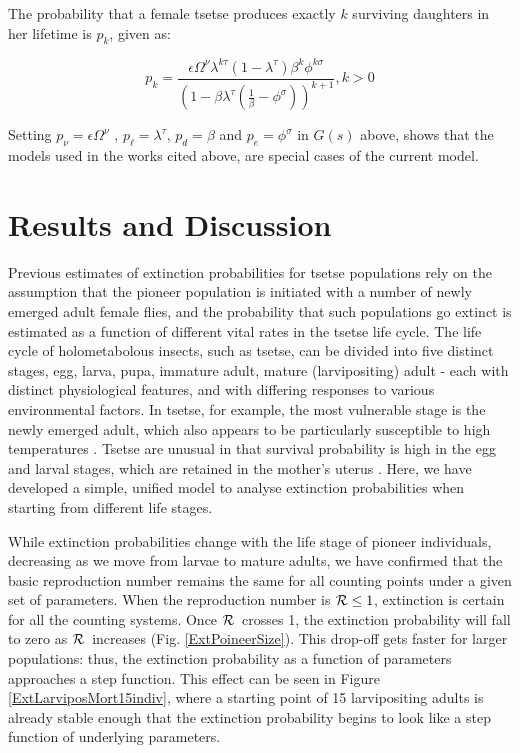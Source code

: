 \documentclass[smallextended]{svjour3}
\newcommand{\Rx}{\ensuremath{\cal R}}
\begin{document}
	The probability that a female tsetse produces exactly $k$ surviving daughters in her lifetime is $p_{k}$, given as:
	
	\begin{equation}
	\label{Johnframework}
	p_{k}= \frac{\epsilon \Omega^{\nu}\lambda^{k\tau}(1-\lambda^{\tau})\beta^{k}\phi^{k\sigma}}{(1-\beta \lambda^\tau(\frac{1}{\beta} -\phi^{\sigma}))^{k+1}},   k>0   
	\end{equation}
	
	Setting  $ p_{\nu}= \epsilon \Omega^{\nu}$ , $p_{\ell} =\lambda^{\tau} $, $p_{d}=\beta$  and $p_{e} = \phi^{\sigma} $ in  $G(s)$ above,   shows that the models used in the works cited above, are special cases of the current model. 
	
	\section{Results and Discussion}
	\label{section8}
	
	Previous estimates of extinction probabilities for tsetse populations rely on the assumption that the pioneer population is initiated with a number of newly emerged adult female flies, and the probability that such populations go extinct is estimated as a function of different vital rates in the tsetse life cycle. The life cycle of holometabolous insects, such as tsetse, can be divided into five distinct stages, egg, larva, pupa, immature adult, mature (larvipositing) adult - each with distinct physiological features, and with differing responses to various environmental factors. In tsetse, for example, the most vulnerable stage is the newly emerged adult, which also appears to be particularly susceptible to high temperatures \cite{Ackley2017a}. Tsetse are unusual in that survival probability is high in the egg and larval stages, which are retained in the mother's uterus \cite{Hargrove1999a}. Here, we have developed a simple, unified model to analyse extinction probabilities when starting from different life stages. 
	
	
	While extinction probabilities change with the life stage of pioneer individuals, decreasing as we move from larvae to mature adults,  we have confirmed that the basic reproduction number remains the same for all counting points under a given set of parameters. When the reproduction number is ${\cal R} \leq 1$, extinction is certain for all the counting systems. Once \Rx\ crosses 1, the extinction probability will fall to zero as \Rx\ increases (Fig. \ref{ExtPoineerSize}). This drop-off gets faster for larger populations: thus, the extinction probability as a function of parameters approaches a step function. This effect can be seen in Figure \ref{ExtLarviposMort15indiv}, where a starting point of 15 larvipositing adults is already stable enough that the extinction probability begins to look like a step function of underlying parameters.
	
\end{document}
